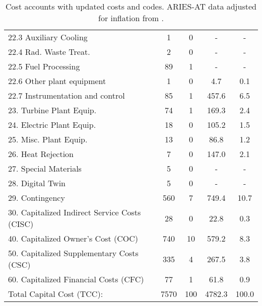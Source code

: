 \begin{table}[h!]
{\begin{tabular}{lcccc}
\hspace{10mm}22.3 Auxiliary Cooling & 1 & 0 & - & - \\
\hspace{10mm}22.4 Rad. Waste Treat. & 2 & 0 & - & - \\
\hspace{10mm}22.5 Fuel Processing & 89 & 1 & - & - \\
\hspace{10mm}22.6 Other plant equipment & 1 & 0 & 4.7 & 0.1 \\
\hspace{10mm}22.7 Instrumentation and control & 85 & 1 & 457.6 & 6.5 \\
\hspace{5mm}23. Turbine Plant Equip. & 74 & 1 & 169.3 & 2.4 \\
\hspace{5mm}24. Electric Plant Equip. & 18 & 0 & 105.2 & 1.5 \\
\hspace{5mm}25. Misc. Plant Equip. & 13 & 0 & 86.8 & 1.2 \\
\hspace{5mm}26. Heat Rejection & 7 & 0 & 147.0 & 2.1 \\
\hspace{5mm}27. Special Materials & 5 & 0 & - & - \\
\hspace{5mm}28. Digital Twin & 5 & 0 & - & - \\
\hspace{5mm}29. Contingency & 560 & 7 & 749.4 & 10.7 \\
30. Capitalized Indirect Service Costs (CISC) & 28 & 0 & 22.8 & 0.3 \\
40. Capitalized Owner’s Cost (COC) & 740 & 10 & 579.2 & 8.3 \\
50. Capitalized Supplementary Costs (CSC) & 335 & 4 & 267.5 & 3.8 \\
60. Capitalized Financial Costs (CFC) & 77 & 1 & 61.8 & 0.9 \\
\hline
Total Capital Cost (TCC): & 7570 & 100 & 4782.3 & 100.0 \\
\hline
\end{tabular}
}
\caption{Cost accounts with updated costs and codes. ARIES-AT data adjusted for inflation from \cite{gordon1986mirror}.}
\label{tab:costs_updated_codes}
\end{table}


